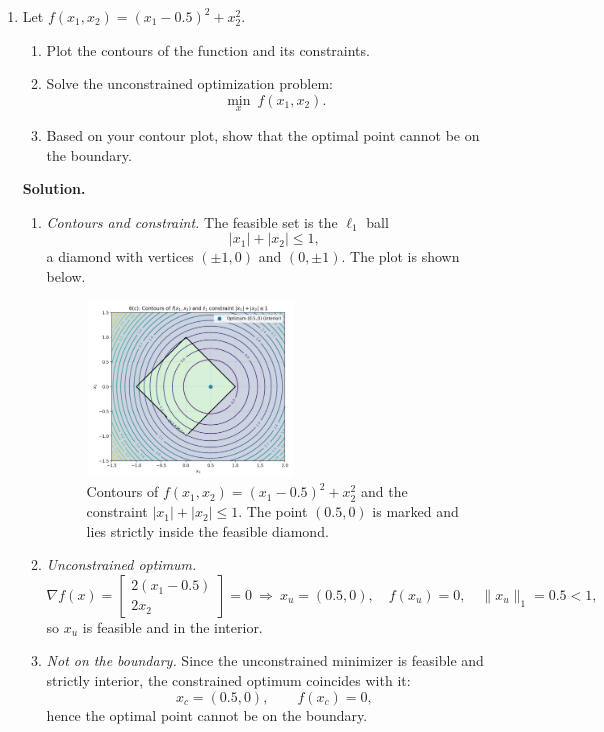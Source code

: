 \documentclass[11pt]{article}
\begin{document}
\begin{enumerate}[label=6(\alph*)]
	\item Let $f(x_1,x_2)=(x_1-0.5)^2+x_2^2$.
	\begin{enumerate}[label=\arabic*)]
		\item Plot the contours of the function and its constraints.
		\item Solve the unconstrained optimization problem:
		\[
		\min_{x}\ f(x_1,x_2).
		\]
		\item Based on your contour plot, show that the optimal point cannot be on the
		boundary.
	\end{enumerate}
	
	\textbf{Solution.}
	
	\begin{enumerate}[label=\arabic*)]
		\item \emph{Contours and constraint.} The feasible set is the $\ell_1$ ball
		\[
		|x_1|+|x_2|\le 1,
		\]
		a diamond with vertices $(\pm 1,0)$ and $(0,\pm 1)$. The plot is shown below.
		
		\begin{figure}[H]
			\centering
			\includegraphics[width=0.55\textwidth]{6c.png}
			\caption{Contours of $f(x_1,x_2)=(x_1-0.5)^2+x_2^2$ and the constraint $|x_1|+|x_2|\le 1$. The point $(0.5,0)$ is marked and lies strictly inside the feasible diamond.}
		\end{figure}
		
		\item \emph{Unconstrained optimum.}
		\[
		\nabla f(x)=\begin{bmatrix}2(x_1-0.5)\\ 2x_2\end{bmatrix}=0
		\ \Rightarrow\ x_u=(0.5,0),\quad f(x_u)=0,\quad \|x_u\|_1=0.5<1,
		\]
		so $x_u$ is feasible and in the interior.
		
		\item \emph{Not on the boundary.} Since the unconstrained minimizer is feasible and strictly interior, the constrained optimum coincides with it:
		\[
		x_c=(0.5,0),\qquad f(x_c)=0,
		\]
		hence the optimal point cannot be on the boundary.
	\end{enumerate}
	

\end{enumerate}
\end{document}
